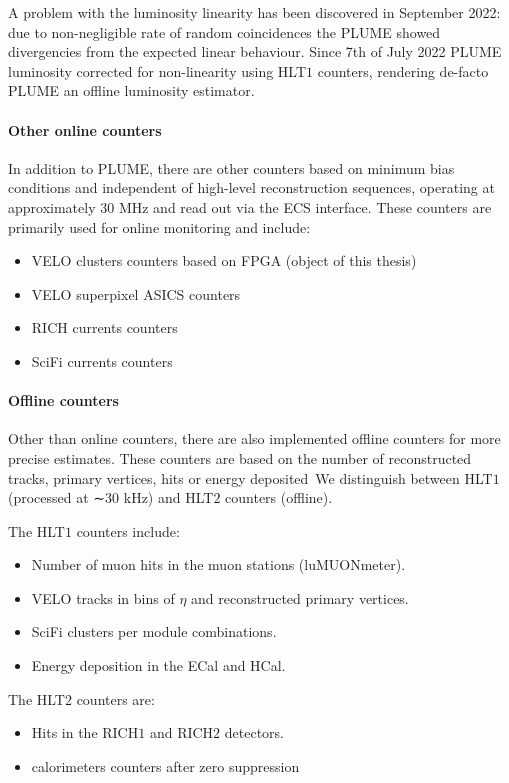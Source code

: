 A problem with the luminosity linearity has been discovered in September 2022: due to non-negligible rate of random coincidences the PLUME showed divergencies from the expected linear behaviour. Since 7th of July 2022 PLUME luminosity corrected for non-linearity using HLT$1$ counters, rendering de-facto PLUME an offline luminosity estimator.


\paragraph{Other online counters} 
In addition to PLUME, there are other counters based on minimum bias conditions and independent of high-level reconstruction sequences, operating at approximately 30 MHz and read out via the ECS interface. These counters are primarily used for online monitoring and include:
\begin{itemize}
   \item VELO clusters counters based on FPGA (object of this thesis)
   \item VELO superpixel ASICS counters
   \item RICH currents counters
   \item SciFi currents counters
\end{itemize}
\paragraph{Offline counters} 
Other than online counters, there are also implemented offline counters for more precise estimates.
These counters are based on the number of reconstructed tracks, primary vertices, hits or energy deposited\
We distinguish between HLT$1$ (processed at ∼30 kHz) and HLT$2$ counters (offline).

The HLT$1$ counters include:
\begin{itemize}
   \item Number of muon hits in the muon stations (luMUONmeter).
   \item  VELO tracks in bins of $\eta$ and reconstructed primary vertices.
   \item SciFi clusters per module combinations.
   \item Energy deposition in the ECal and HCal.
\end{itemize}
The HLT$2$ counters are:
\begin{itemize}
    \item Hits in the RICH$1$ and RICH$2$ detectors.
    \item calorimeters counters after zero suppression 
\end{itemize}

